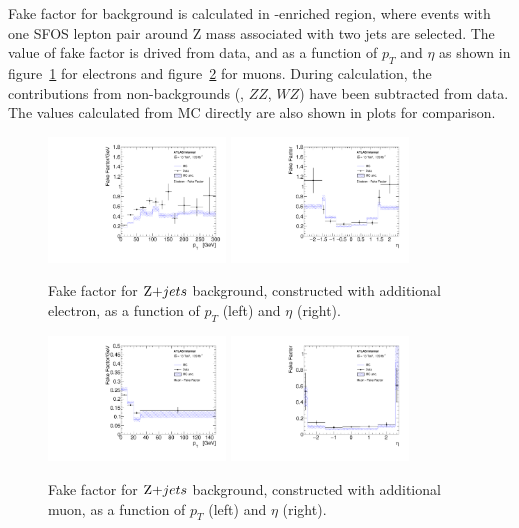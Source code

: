 Fake factor for \Zjet background is calculated in \Zjet-enriched region, where events with one SFOS lepton pair around Z mass associated with two jets are selected.
The value of fake factor is drived from data, and as a function of $p_{T}$ and $\eta$ as shown in figure~\ref{fig:fake_zjet_el} for electrons and figure~\ref{fig:fake_zjet_mu} for muons.
During calculation, the contributions from non-\Zjet backgrounds (\ttbar, $ZZ$, $WZ$) have been subtracted from data.
The values calculated from \Zjet MC directly are also shown in plots for comparison.
\begin{figure}[!htb]
  \centering
  \includegraphics[width=0.42\textwidth]{figures/VBSZZ/fakebkg/Electron_2Dff_ptfakeFactorAddElectron_etapt_pavgy.pdf}
  \includegraphics[width=0.42\textwidth]{figures/VBSZZ/fakebkg/Electron_2Dff_etafakeFactorAddElectron_etapt_pavgx.pdf}
  \caption{Fake factor for $\Zjet$ background, constructed with additional electron, as a function of $p_{T}$ (left) and $\eta$ (right).}
  \label{fig:fake_zjet_el}
\end{figure}

\begin{figure}[!htb]
  \centering
  \includegraphics[width=0.42\textwidth]{figures/VBSZZ/fakebkg/Muon_2Dff_ptfakeFactorAddMuon_etapt_pavgy.pdf}
  \includegraphics[width=0.42\textwidth]{figures/VBSZZ/fakebkg/Muon_2Dff_etafakeFactorAddMuon_etapt_pavgx.pdf}
  \caption{Fake factor for $\Zjet$ background, constructed with additional muon, as a function of $p_{T}$ (left) and $\eta$ (right).}
  \label{fig:fake_zjet_mu}
\end{figure}

